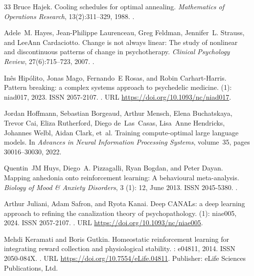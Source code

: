 \documentclass[12pt,fleqn]{article}
\begin{document}
\begin{thebibliography}{33}
  Bruce Hajek.
  \newblock Cooling schedules for optimal annealing.
  \newblock \emph{Mathematics of Operations Research}, 13(2):311--329, 1988.
  \newblock {}.

  Adele~M. Hayes, Jean-Philippe Laurenceau, Greg Feldman, Jennifer~L. Strauss,
  and LeeAnn Cardaciotto.
  \newblock Change is not always linear: The study of nonlinear and
  discontinuous patterns of change in psychotherapy.
  \newblock \emph{Clinical Psychology Review}, 27(6):715--723, 2007.
  \newblock {}.

  In\^es Hip\'olito, Jonas Mago, Fernando~E Rosas, and Robin Carhart-Harris.
  \newblock Pattern breaking: a complex systems approach to psychedelic medicine.
   (1): niad017, 2023.
  \newblock ISSN 2057-2107.
  \newblock {}.
  \newblock URL \url{https://doi.org/10.1093/nc/niad017}.

  Jordan Hoffmann, Sebastian Borgeaud, Arthur Mensch, Elena Buchatskaya, Trevor
  Cai, Eliza Rutherford, Diego de~Las~Casas, Lisa~Anne Hendricks, Johannes
  Welbl, Aidan Clark, et~al.
  \newblock Training compute-optimal large language models.
  \newblock In \emph{Advances in Neural Information Processing Systems},
  volume~35, pages 30016--30030, 2022.

  Quentin~JM Huys, Diego~A. Pizzagalli, Ryan Bogdan, and Peter Dayan.
  \newblock Mapping anhedonia onto reinforcement learning: A behavioural
  meta-analysis.
  \newblock \emph{Biology of Mood \& Anxiety Disorders}, 3 (1):
  12, June 2013.
  \newblock ISSN 2045-5380.
  \newblock {}.

  Arthur Juliani, Adam Safron, and Ryota Kanai.
  \newblock Deep {CANALs}: a deep learning approach to refining the canalization
  theory of psychopathology.
   (1): niae005, 2024.
  \newblock ISSN 2057-2107.
  \newblock {}.
  \newblock URL \url{https://doi.org/10.1093/nc/niae005}.

  Mehdi Keramati and Boris Gutkin.
  \newblock Homeostatic reinforcement learning for integrating reward collection
  and physiological stability.
  : e04811, 2014.
  \newblock ISSN 2050-084X.
  \newblock {}.
  \newblock URL \url{https://doi.org/10.7554/eLife.04811}.
  \newblock Publisher: {eLife} Sciences Publications, Ltd.


\end{thebibliography}
\end{document}

